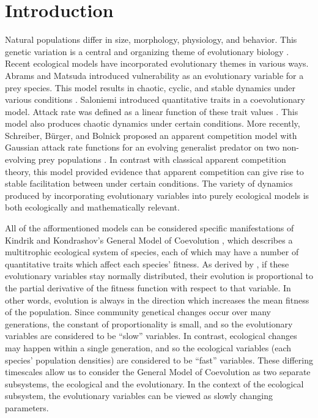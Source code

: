 \documentclass{amsart}
\theoremstyle{definition}
\theoremstyle{remark}
\numberwithin{equation}{section}
\begin{document}
\section{Introduction}

Natural populations differ in size, morphology, physiology, and behavior.  This genetic variation is a central and organizing theme of evolutionary biology \cite{Schreiber_2011}.  Recent ecological models have incorporated evolutionary themes in various ways.  Abrams and Matsuda introduced vulnerability as an evolutionary variable for a prey species.  This model results in chaotic, cyclic, and stable dynamics under various conditions \cite{Abrams_Matsuda_1997}.  Saloniemi introduced quantitative traits in a coevolutionary model.  Attack rate was defined as a linear function of these trait values \cite{Saloniemi_1993}.  This model also produces chaotic dynamics under certain conditions.  More recently, Schreiber, B\"urger, and Bolnick proposed an apparent competition model with Gaussian attack rate functions for an evolving generalist predator on two non-evolving prey populations \cite{Schreiber_2011}.  In contrast with classical apparent competition theory, this model provided evidence that apparent competition can give rise to stable facilitation between under certain conditions.  The variety of dynamics produced by incorporating evolutionary variables into purely ecological models is both ecologically and mathematically relevant.

All of the afformentioned models can be considered specific manifestations of Kindrik and Kondrashov's General Model of Coevolution \cite{Khibnik_Kondrashov_1997}, which describes a multitrophic ecological system of species, each of which may have a number of quantitative traits which affect each species' fitness.  As derived by \cite{Lande_1976}, if these evolutionary variables stay normally distributed, their evolution is proportional to the partial derivative of the fitness function with respect to that variable.  In other words, evolution is always in the direction which increases the mean fitness of the population.  Since community genetical changes occur over many generations, the constant of proportionality is small, and so the evolutionary variables are considered to be ``slow'' variables.  In contrast, ecological changes may happen within a single generation, and so the ecological variables (each species' population densities) are considered to be ``fast'' variables.  These differing timescales allow us to consider the General Model of Coevolution as two separate subsystems, the ecological and the evolutionary.  In the context of the ecological subsystem, the evolutionary variables can be viewed as slowly changing parameters.
\end{document}
